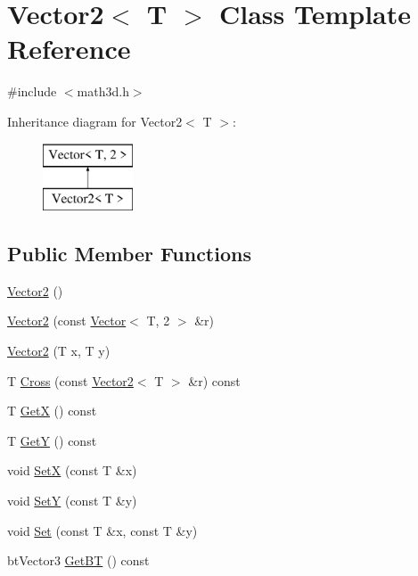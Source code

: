 \hypertarget{class_vector2}{}\section{Vector2$<$ T $>$ Class Template Reference}
\label{class_vector2}


{\ttfamily \#include $<$math3d.\+h$>$}

Inheritance diagram for Vector2$<$ T $>$\+:\begin{figure}[H]
\begin{center}
\leavevmode
\includegraphics[height=2.000000cm]{class_vector2}
\end{center}
\end{figure}
\subsection*{Public Member Functions}
\begin{DoxyCompactItemize}
\item 
\hyperlink{class_vector2_ae2f1223cb0d664aa73afb789086a4174}{Vector2} ()
\item 
\hyperlink{class_vector2_ac66e49e7814a2c7e394b31d64ed1ba37}{Vector2} (const \hyperlink{class_vector}{Vector}$<$ T, 2 $>$ \&r)
\item 
\hyperlink{class_vector2_ae59e0a10f842521cb7e256ef976ead77}{Vector2} (T x, T y)
\item 
T \hyperlink{class_vector2_a3515bd176ea3f7f5d3558332d4e8467f}{Cross} (const \hyperlink{class_vector2}{Vector2}$<$ T $>$ \&r) const 
\item 
T \hyperlink{class_vector2_ad1dbbb8e7194e7714f8fa85b49e783c7}{Get\+X} () const 
\item 
T \hyperlink{class_vector2_a6be400ba8f30a9cb44f34826e22d28c8}{Get\+Y} () const 
\item 
void \hyperlink{class_vector2_a40af8778aa3d4094a7849389984460a8}{Set\+X} (const T \&x)
\item 
void \hyperlink{class_vector2_abf18c31b0d573b7bf92b8fd91273a08a}{Set\+Y} (const T \&y)
\item 
void \hyperlink{class_vector2_a65267bb2252d019925fdb559b85bdc41}{Set} (const T \&x, const T \&y)
\item 
bt\+Vector3 \hyperlink{class_vector2_a580ec50e199edca4b6ba2db0782367f1}{Get\+B\+T} () const 
\end{DoxyCompactItemize}
